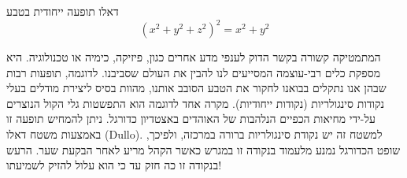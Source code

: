 \begin{surferPage}{דאלו}
תופעה ייחודית בטבע\\
\smallskip
\[(x^2+ y^2+ z^2)^2	= x^2+ y^2\]

\singlespacing
המתמטיקה קשורה בקשר הדוק לענפי מדע אחרים כגון, פיזיקה, כימיה או טכנולוגיה. היא מספקת כלים רבי-עוצמה המסייעים לנו להבין את העולם שסביבנו. 
\singlespacing
לדוגמה, תופעות רבות שבהן אנו נתקלים בבואנו לחקור את הטבע הסובב אותנו, מהוות בסיס ליצירת מודלים בעלי נקודות סינגולריות (נקודות ייחודיות).
\singlespacing
מקרה אחד לדוגמה הוא התפשטות גלי הקול הנוצרים על-ידי מחיאות הכפיים הנלהבות של האוהדים באצטדיון כדורגל. ניתן להמחיש תופעה זו באמצעות משטח דאלו (Dullo). למשטח זה יש נקודת סינגולריות ברורה במרכזה, ולפיכך, שופט הכדורגל נמנע מלעמוד בנקודה זו במגרש כאשר הקהל מריע לאחר הבקעת שער. הרעש בנקודה זו כה חזק עד כי הוא עלול להזיק לשמיעתו!
\end{surferPage}
